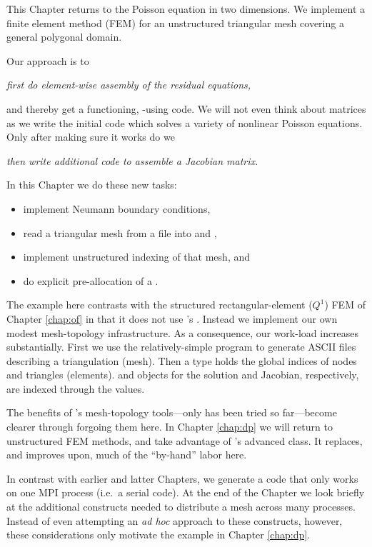 
This Chapter returns to the Poisson equation in two dimensions.  We implement a finite element method (FEM) for an unstructured triangular mesh covering a general polygonal domain.

Our approach is to
\begin{center}
\emph{first do element-wise assembly of the residual equations,}
\end{center}
and thereby get a functioning, \pSNES-using code.  We will not even think about matrices as we write the initial code which solves a variety of nonlinear Poisson equations.  Only after making sure it works do we
\begin{center}
\emph{then write additional code to assemble a Jacobian matrix.}
\end{center}

In this Chapter we do these new tasks:
\begin{itemize}
\item implement Neumann boundary conditions,
\item read a triangular mesh from a file into \PETSc \pVecs and \pISs,
\item implement unstructured indexing of that mesh, and
\item do explicit pre-allocation of a \PETSc \pMat.
\end{itemize}

The example here contrasts with the structured rectangular-element ($Q^1$) FEM of Chapter \ref{chap:of} in that it does not use \PETSc's \pDMDA.  Instead we implement our own modest mesh-topology infrastructure.  As a consequence, our work-load increases substantially.  First we use the relatively-simple \Triangle program to generate ASCII files describing a triangulation (mesh).  Then a \PETSc \pIS type holds the global indices of nodes and triangles (elements).  \PETSc \pVec and \pMat objects for the solution and Jacobian, respectively, are indexed through the \pIS values.

The benefits of \PETSc's mesh-topology \pDM tools---only \pDMDA has been tried so far---become clearer through forgoing them here.  In Chapter \ref{chap:dp} we will return to unstructured FEM methods, and take advantage of \PETSc's advanced \pDMPlex class.  It replaces, and improves upon, much of the ``by-hand'' labor here.

In contrast with earlier and latter Chapters, we generate a code that only works on one MPI process (i.e.~a serial code).  At the end of the Chapter we look briefly at the additional constructs needed to distribute a mesh across many processes.  Instead of even attempting an \emph{ad hoc} approach to these constructs, however, these considerations only motivate the \pDMPlex example in Chapter \ref{chap:dp}.

